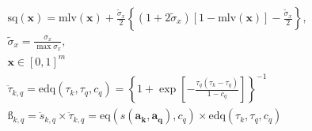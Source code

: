 \documentclass{article}
\begin{document}
\begin{gather}
    \text{sq}(\boldsymbol{x}) = 
    \text{mlv}(\boldsymbol{x}) + 
    \frac{\tilde{\sigma}_{x}}{2}\left\{
        (1 + 2\tilde{\sigma}_{x})[1 - \text{mlv}(\boldsymbol{x})] -
        \frac{\tilde{\sigma}_{x}}{2}
    \right\},\\
    \tilde{\sigma}_{x} = \frac{\sigma_{x}}{\max \sigma_{x}},\\
    \boldsymbol{x} \in [0,1]^{m}\\
    \ddot{\tau}_{k,q} = 
    \text{edq}(\tau_{k}, \tau_{q}, c_{q}) = 
    \left\{
        1 + \exp[-
        \frac{
            \tau_{q}
            (\tau_{k} - \tau_{q})
        }{
            1 - c_{q}
        }
        ]
    \right\} ^ {-1}\\
    \textit{\ss}_{k,q} = 
    \ddot{s}_{k,q}
    \times
    \ddot{\tau}_{k,q} = 
    \text{eq}(s(\boldsymbol{a_k},\boldsymbol{a_q}), c_q)
    \times
    \text{edq}(\tau_{k}, \tau_{q}, c_{q})
\end{gather}
\end{document}
